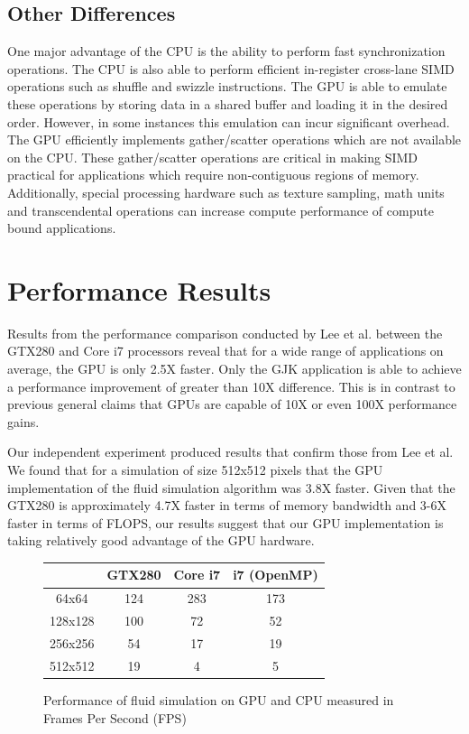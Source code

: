 \documentclass[conference]{IEEEtran}
\begin{document}
\subsection{Other Differences}

One major advantage of the CPU is the ability to perform fast synchronization operations. The CPU is also able to perform efficient in-register cross-lane SIMD operations such as shuffle and swizzle instructions. The GPU is able to emulate these operations by storing data in a shared buffer and loading it in the desired order. However, in some instances this emulation can incur significant overhead. The GPU efficiently implements gather/scatter operations which are not available on the CPU. These gather/scatter operations are critical in making SIMD practical for applications which require non-contiguous regions of memory. Additionally, special processing hardware such as texture sampling, math units and transcendental operations can increase compute performance of compute bound applications. 

\section{Performance Results}

Results from the performance comparison conducted by Lee et al. between the GTX280 and Core i7 processors reveal that for a wide range of applications on average, the GPU is only 2.5X faster. Only the GJK application is able to achieve a performance improvement of greater than 10X difference. This is in contrast to previous general claims that GPUs are capable of 10X or even 100X performance gains.

Our independent experiment produced results that confirm those from Lee et al. We found that for a simulation of size 512x512 pixels that the GPU implementation of the fluid simulation algorithm was 3.8X faster. Given that the GTX280 is approximately 4.7X faster in terms of memory bandwidth and 3-6X faster in terms of FLOPS, our results suggest that our GPU implementation is taking relatively good advantage of the GPU hardware. 

\begin{figure}
\begin{center} 
\begin{tabular}{ | c | c | c | c | } 
\hline   & GTX280 & Core i7 &  i7 (OpenMP) \\ 
\hline 64x64 & 124 & 283  & 173 \\ 
\hline 128x128 & 100 & 72 & 52 \\ 
\hline 256x256 & 54 & 17 & 19 \\ 
\hline 512x512 & 19 & 4 & 5 \\ 
\hline \end{tabular} 
\end{center}
\caption{Performance of fluid simulation on GPU and CPU measured in Frames Per Second (FPS)}
\end{figure}
\end{document}
